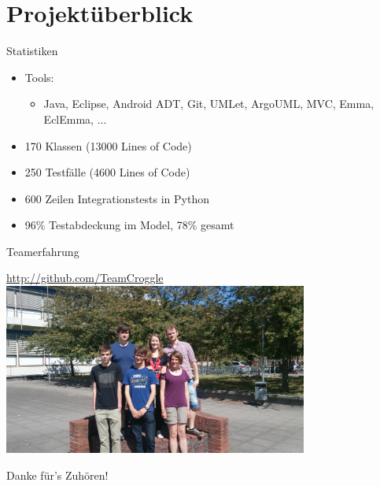 \section{Projektüberblick}

\begin{frame}{Statistiken}
	\begin{itemize}
		\item Tools:
		\begin{itemize}
			\item Java, Eclipse, Android ADT, Git, UMLet, ArgoUML, MVC, Emma, EclEmma, ...
		\end{itemize}
		\item 170 Klassen (13000 Lines of Code)
		\item 250 Testfälle (4600 Lines of Code)
		\item 600 Zeilen Integrationstests in Python
		\item 96\% Testabdeckung im Model, 78\% gesamt
	\end{itemize}
\end{frame}

\begin{frame}{Teamerfahrung}
	\begin{center}
		\textcolor{blue}{\href{http://github.com/TeamCroggle}{http://github.com/TeamCroggle}}
		\includegraphics[width=10cm,type=jpg,ext=.jpg,read=.jpg]{media/2014-06-24 10.56.29}
	\end{center}
\end{frame}

\begin{frame}
	\begin{center}
		\Huge
		Danke für's Zuhören!
	\end{center}
\end{frame}

